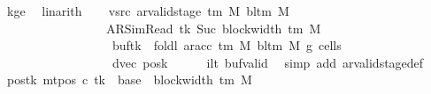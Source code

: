 \begin{isabellebody}
\ kge{}\ \isamarkupfalse%
\ linarith\isanewline
\ \ \isamarkupfalse%
\ vsrc{}{\isacharcolon}{\kern0pt}\ {\isachardoublequoteopen}ar{\isacharunderscore}{\kern0pt}valid{\isacharunderscore}{\kern0pt}stage\ {\isacharparenleft}{\kern0pt}{\isasymGamma}{\isacharunderscore}{\kern0pt}tm\ M{\isacharparenright}{\kern0pt}\ {\isacharparenleft}{\kern0pt}bl{\isacharunderscore}{\kern0pt}tm\ M{\isacharparenright}{\kern0pt}\isanewline
\ \ \ \ \ \ \ \ \ \ \ \ \ \ \ \ \ {\isacharparenleft}{\kern0pt}AR{\isacharunderscore}{\kern0pt}SimRead{\isacharcomma}{\kern0pt}\ tk{\isacharcomma}{\kern0pt}\ Suc\ {\isacharparenleft}{\kern0pt}block{\isacharunderscore}{\kern0pt}width\ {\isacharparenleft}{\kern0pt}{\isasymGamma}{\isacharunderscore}{\kern0pt}tm\ M{\isacharparenright}{\kern0pt}{\isacharparenright}{\kern0pt}{\isacharcomma}{\kern0pt}\isanewline
\ \ \ \ \ \ \ \ \ \ \ \ \ \ \ \ \ \ buf{\isacharparenleft}{\kern0pt}tk\ {\isacharcolon}{\kern0pt}{\isacharequal}{\kern0pt}\ foldl\ {\isacharparenleft}{\kern0pt}ar{\isacharunderscore}{\kern0pt}acc\ {\isacharparenleft}{\kern0pt}{\isasymGamma}{\isacharunderscore}{\kern0pt}tm\ M{\isacharparenright}{\kern0pt}\ {\isacharparenleft}{\kern0pt}bl{\isacharunderscore}{\kern0pt}tm\ M{\isacharparenright}{\kern0pt}{\isacharparenright}{\kern0pt}\ {\isacharquery}{\kern0pt}g{}\ {\isacharquery}{\kern0pt}cells{}{\isacharparenright}{\kern0pt}{\isacharcomma}{\kern0pt}\isanewline
\ \ \ \ \ \ \ \ \ \ \ \ \ \ \ \ \ \ dvec{\isacharcomma}{\kern0pt}\ {\isacharquery}{\kern0pt}posk{\isacharprime}{\kern0pt}{\isacharparenright}{\kern0pt}{\isachardoublequoteclose}\isanewline
\ \ \ \ \isamarkupfalse%
\ ilt\ buf{}{\isacharunderscore}{\kern0pt}valid\ \isamarkupfalse%
\ {\isacharparenleft}{\kern0pt}simp\ add{\isacharcolon}{\kern0pt}\ ar{\isacharunderscore}{\kern0pt}valid{\isacharunderscore}{\kern0pt}stage{\isacharunderscore}{\kern0pt}def{\isacharparenright}{\kern0pt}\isanewline
\ \ \isamarkupfalse%
\ pos{}{\isacharunderscore}{\kern0pt}tk{\isacharcolon}{\kern0pt}\ {\isachardoublequoteopen}mt{\isacharunderscore}{\kern0pt}pos\ c{}\ tk\ {\isacharequal}{\kern0pt}\ base\ {\isacharplus}{\kern0pt}\ {\isacharparenleft}{\kern0pt}block{\isacharunderscore}{\kern0pt}width\ {\isacharparenleft}{\kern0pt}{\isasymGamma}{\isacharunderscore}{\kern0pt}tm\ M{\isacharparenright}{\kern0pt}\ {\isacharminus}{\kern0pt}\ {}{\isacharparenright}{\kern0pt}{\isachardoublequoteclose}\ \isamarkupfalse%

\end{isabellebody}
